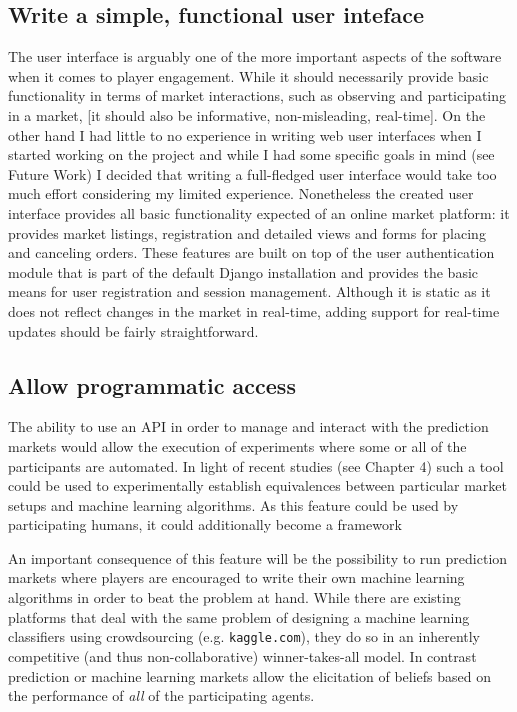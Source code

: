 \documentclass[bsc,frontabs,twoside,singlespacing,parskip,deptreport]{infthesis}     %
\begin{document}
\subsection{Write a simple, functional user inteface}
	The user interface is arguably one of the more important aspects of the software when it comes to player engagement. While it should necessarily provide basic functionality in terms of market interactions, such as observing and participating in a market, [it should also be informative, non-misleading, real-time]. On the other hand I had little to no experience in writing web user interfaces when I started working on the project and while I had some specific goals in mind (see Future Work) I decided that writing a full-fledged user interface would take too much effort considering my limited experience. 
	Nonetheless the created user interface provides all basic functionality expected of an online market platform: it provides market listings, registration and detailed views and forms for placing and canceling orders. These features are built on top of the user authentication module that is part of the default Django installation and provides the basic means for user registration and session management. Although it is static as it does not reflect changes in the market in real-time, adding support for real-time updates should be fairly straightforward. 
	

\subsection{Allow programmatic access}
	The ability to use an API in order to manage and interact with the prediction markets would allow the execution of experiments where some or all of the participants are automated. In light of recent studies (see Chapter 4) such a tool could be used to experimentally establish equivalences between particular market setups and machine learning algorithms. As this feature could be used by participating humans, it could additionally become a framework 

	An important consequence of this feature will be the possibility to run prediction markets where players are encouraged to write their own machine learning algorithms in order to beat the problem at hand. While there are existing platforms that deal with the same problem of designing a machine learning classifiers using crowdsourcing (e.g. {\tt kaggle.com}), they do so in an inherently competitive (and thus non-collaborative) winner-takes-all model. In contrast prediction or machine learning markets allow the elicitation of beliefs based on the performance of {\em all} of the participating agents. 
\end{document}
